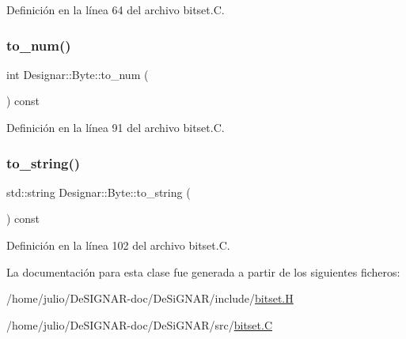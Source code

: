 Definición en la línea 64 del archivo bitset.\+C.

\mbox{\label{class_designar_1_1_byte_a1f10a6e5ad399f62c0d53ace68c7e43d}} 
\subsubsection{\texorpdfstring{to\+\_\+num()}{to\_num()}}
{\footnotesize\ttfamily int Designar\+::\+Byte\+::to\+\_\+num (\begin{DoxyParamCaption}{ }\end{DoxyParamCaption}) const}



Definición en la línea 91 del archivo bitset.\+C.

\mbox{\label{class_designar_1_1_byte_afddf5962874234208805ece07f31916d}} 
\subsubsection{\texorpdfstring{to\+\_\+string()}{to\_string()}}
{\footnotesize\ttfamily std\+::string Designar\+::\+Byte\+::to\+\_\+string (\begin{DoxyParamCaption}{ }\end{DoxyParamCaption}) const}



Definición en la línea 102 del archivo bitset.\+C.



La documentación para esta clase fue generada a partir de los siguientes ficheros\+:\begin{DoxyCompactItemize}
\item 
/home/julio/\+De\+S\+I\+G\+N\+A\+R-\/doc/\+De\+Si\+G\+N\+A\+R/include/\hyperlink{bitset_8_h}{bitset.\+H}\item 
/home/julio/\+De\+S\+I\+G\+N\+A\+R-\/doc/\+De\+Si\+G\+N\+A\+R/src/\hyperlink{bitset_8_c}{bitset.\+C}\end{DoxyCompactItemize}
